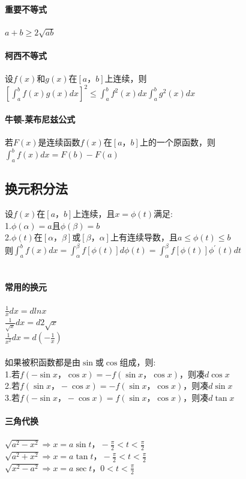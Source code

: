 \documentclass{article}
\begin{document}
\begin{flushleft}
	\paragraph{重要不等式}
	$a+b\ge 2\sqrt{ab}$\\
	\paragraph{柯西不等式}
	设$f(x)$和$g(x)$在$[a，b]$上连续，则$[\int_{a}^{b}f(x)g(x)dx]^2\le \int_{a}^{b}f^2(x)dx\int_{a}^{b}g^2(x)dx$\\
	\paragraph{牛顿-莱布尼兹公式}
	若$F(x)$是连续函数$f(x)$在$[a，b]$上的一个原函数，则$\int_{a}^{b}f(x)dx=F(b)-F(a)$\\
	
	\subsection{换元积分法}
	
	设$f(x)$在$[a，b]$上连续，且$x=\phi(t)$满足:\\
	1.$\phi(\alpha)=a$且$\phi(\beta)=b$\\
	2.$\phi(t)$在$[\alpha，\beta]$或$[\beta，\alpha]$上有连续导数，且$a\le \phi(t)\le b$\\
	则$\int_{a}^{b}f(x)dx=\int_{\alpha}^{\beta}f[\phi(t)]d\phi(t)=\int_{\alpha}^{\beta}f[\phi(t)]\phi^{'}(t)dt$\\
	~\\
	\paragraph{常用的换元}
	$\frac{1}{x}dx=dlnx$\\
	$\frac{1}{\sqrt{x}}dx=d2\sqrt{x}$\\
	$\frac{1}{x^2}dx=d(-\frac{1}{x})$\\
	~\\
	如果被积函数都是由$\sin$或$\cos$组成，则:\\
	1.若$f(-\sin x，\cos x)=-f(\sin x，\cos x)$，则凑$d\cos x$\\
	2.若$f(\sin x，-\cos x)=-f(\sin x，\cos x)$，则凑$d\sin x$\\
	3.若$f(-\sin x，-\cos x)=f(\sin x，\cos x)$，则凑$d\tan x$\\
	\paragraph{三角代换}
	$\sqrt{a^2-x^2} \Rightarrow x=a\sin t， -\frac{\pi}{2}<t<\frac{\pi}{2}$\\
	$\sqrt{a^2+x^2} \Rightarrow x=a\tan t， -\frac{\pi}{2}<t<\frac{\pi}{2}$\\
	$\sqrt{x^2-a^2} \Rightarrow x=a\sec t， 0<t<\frac{\pi}{2}$\\

\end{flushleft}
\end{document}
